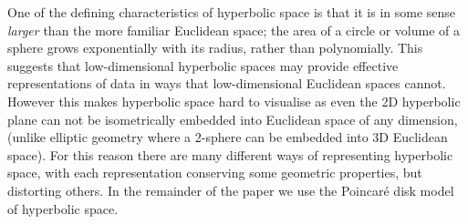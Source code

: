 \documentclass[sigconf, review]{acmart}
\begin{document}
One of the defining characteristics of hyperbolic space is that it is in some sense \textit{larger} than the more familiar Euclidean space; the area of a circle or volume of a sphere grows exponentially with its radius, rather than polynomially.
This suggests that low-dimensional hyperbolic spaces may provide effective representations of data in ways that low-dimensional Euclidean spaces cannot.
However this makes hyperbolic space hard to visualise as even the 2D hyperbolic plane can not be isometrically embedded into Euclidean space of any dimension,(unlike elliptic geometry where a 2-sphere can be embedded into 3D Euclidean space). 
For this reason there are many different ways of representing hyperbolic space, with each representation conserving some geometric properties, but distorting others. In the remainder of the paper we use the Poincar\'e disk model of hyperbolic space.
\end{document}
